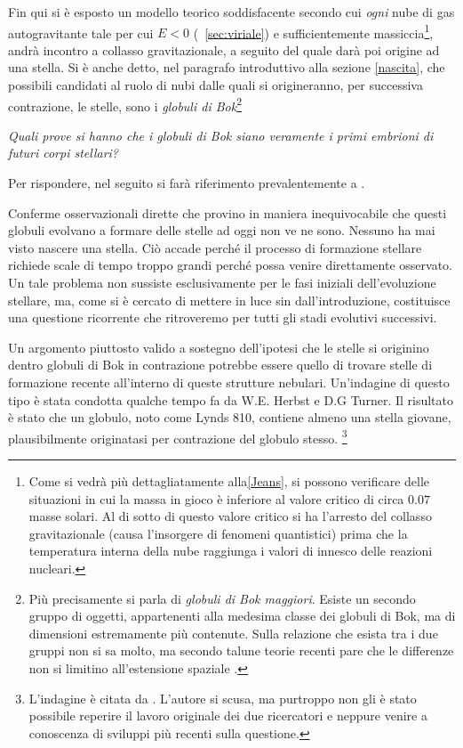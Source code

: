 \smallskip

Fin qui si \`{e} esposto un modello teorico soddisfacente secondo cui \emph{ogni} nube di gas autogravitante tale per cui $E<0$ (\sectionname~\ref{sec:viriale}) e sufficientemente massiccia\footnote{Come si vedr\`{a} pi\`{u} dettagliatamente alla\ref{Jeans}, si possono verificare delle situazioni in cui la massa in gioco \`{e} inferiore al valore critico di circa $0.07$ masse solari. Al di sotto di questo valore critico si ha l'arresto del collasso gravitazionale (causa l'insorgere di fenomeni quantistici) prima che la temperatura interna della nube raggiunga i valori di innesco delle reazioni nucleari.}, andr\`{a} incontro a collasso gravitazionale, a seguito del quale dar\`{a} poi origine ad una stella. Si \`{e} anche detto, nel paragrafo introduttivo alla sezione \ref{nascita}, che possibili candidati al ruolo di nubi dalle quali si origineranno, per successiva contrazione, le stelle, sono i \emph{globuli di Bok}\footnote{Pi\`{u} precisamente si parla di \emph{globuli di Bok maggiori}. Esiste un secondo gruppo di oggetti, appartenenti alla medesima classe dei globuli di Bok, ma di dimensioni estremamente pi\`{u} contenute. Sulla relazione che esista tra i due gruppi non si sa molto, ma secondo talune teorie recenti pare che le differenze non si limitino all'estensione spaziale \Cite{dick}.}
%
%
%
%
\par
\emph{Quali prove si hanno che i globuli di Bok siano veramente i primi embrioni di futuri corpi stellari?}
\par
Per rispondere, nel seguito si far\`{a} riferimento prevalentemente a \Cite{dick}.%
\par

\smallskip

Conferme osservazionali dirette che provino in maniera inequivocabile che questi globuli evolvano a formare delle stelle ad oggi non ve ne sono.
Nessuno ha mai visto nascere una stella.
Ci\`{o} accade perch\'{e} il processo di formazione stellare richiede scale di tempo troppo grandi perch\'{e} possa venire direttamente osservato.
Un tale problema non sussiste esclusivamente per le fasi iniziali dell'evoluzione stellare, ma, come si \`{e} cercato di mettere in luce sin dall'introduzione, costituisce una questione ricorrente che ritroveremo per tutti gli stadi evolutivi successivi.
\par
Un argomento piuttosto valido a sostegno dell'ipotesi che le stelle si originino dentro globuli di Bok in contrazione potrebbe essere quello di trovare stelle di formazione recente all'interno di queste strutture nebulari. Un'indagine di questo tipo \`{e} stata condotta qualche tempo fa da W.E. Herbst e D.G Turner. Il risultato \`{e} stato che un globulo, noto come Lynds 810, contiene almeno una stella giovane, plausibilmente originatasi per contrazione del globulo stesso.
\footnote{L'indagine \`{e} citata da \Cite{dick}. %
L'autore si scusa, ma purtroppo non gli \`{e} stato possibile reperire il lavoro originale dei due ricercatori e neppure venire a conoscenza di sviluppi pi\`{u} recenti sulla questione.}
\par


